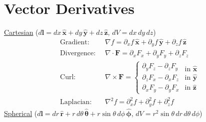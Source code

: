 \section{Vector Derivatives}
\underline{Cartesian} ($d\mathbf{l} = dx\,\hat{\mathbf{x}} + dy\,\hat{\mathbf{y}} + dz\,\hat{\mathbf{z}}$, $dV = dx\,dy\,dz$)
\begin{align*}
\text{Gradient:}   \;\; &\nabla f = \partial_x f\,\hat{\mathbf{x}} 
                                 + \partial_y f\,\hat{\mathbf{y}} 
                                 + \partial_z f\,\hat{\mathbf{z}} \\[2pt]
\text{Divergence:} \;\; &\nabla \cdot \mathbf{F} = \partial_x F_x 
                                 + \partial_y F_y 
                                 + \partial_z F_z \\[2pt]
\text{Curl:}       \;\; &\nabla \times \mathbf{F} = \begin{cases}
                                  \partial_y F_z - \partial_z F_y \\[3pt]
                                  \partial_z F_x - \partial_x F_z \\[3pt]
                                  \partial_x F_y - \partial_y F_x
                                  \end{cases} 
                                  \begin{matrix}
                                  \text{in } \hat{\mathbf{x}} \\[3pt]
                                  \text{in } \hat{\mathbf{y}} \\[3pt]
                                  \text{in } \hat{\mathbf{z}}
                                  \end{matrix} \\[2pt]
\text{Laplacian:}  \;\; &\nabla^2 f = \partial^2_x f + \partial^2_y f + \partial^2_z f
\end{align*}
\underline{Spherical} ($d\mathbf{l} = dr\,\hat{\mathbf{r}} + r\,d\theta\,\bm{\hat{\theta}} + r\sin\theta\,d\phi\,\bm{\hat{\phi}}$, $dV = r^2\sin\theta\,dr\,d\theta\,d\phi$)
